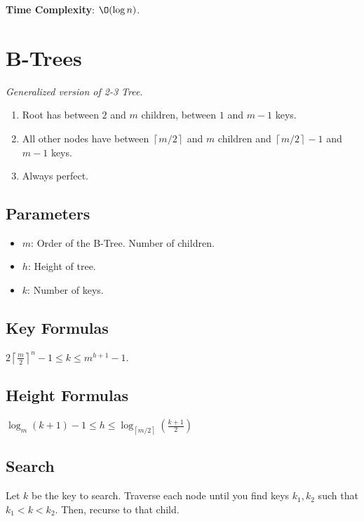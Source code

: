 \documentclass[12pt, letterpaper]{article}
\newcommand{\ce}[1]{
    \left\lceil #1 \right\rceil
}
\begin{document}
\begin{multicols*}{3}
        { \bf Time Complexity}: $\O(\log n)$.






        
        \section{B-Trees}
        {\it Generalized version of 2-3 Tree}.
        \begin{enumerate}
            \item Root has between $2$ and $m$ children, between $1$ and $m - 1$ keys.
            \item All other nodes have between $\ce{m / 2}$ and $m$ children and $\ce{m / 2} - 1$ and $m - 1$ keys.
            \item Always perfect.
        \end{enumerate}

        


        \subsection{Parameters}
        \begin{itemize}
            \item $m$: Order of the B-Tree. Number of children.
            \item $h$: Height of tree.
            \item $k$: Number of keys.
        \end{itemize}




        \subsection{Key Formulas}
        $2 \ce{\frac{m}{2}}^n - 1 \le k \le m^{h + 1} - 1$.


        \subsection{Height Formulas}
        $\log_m (k + 1) - 1 \le h \le \log_{\ce{m / 2}} \left(\frac{k + 1}{2}\right)$


        \subsection{Search}
        Let $k$ be the key to search. Traverse each node until you find keys $k_1, k_2$ such that $k_1 < k < k_2$. Then, recurse to that child.


\end{multicols*}
\end{document}
